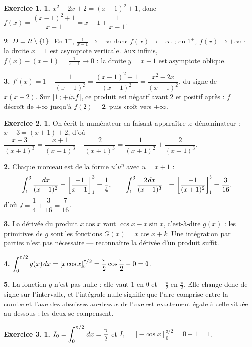 \begin{corrige}
\textbf{Exercice 1. 1.} $x^{2}-2x+2 = (x-1)^{2}+1$, donc
$f(x) = \dfrac{(x-1)^{2}+1}{x-1} = x-1+\dfrac{1}{x-1}$.

\textbf{2.} $D = R\setminus\{1\}$. En $1^{-}$, $\frac{1}{x-1}\to-\infty$
donc $f(x)\to-\infty$ ; en $1^{+}$, $f(x)\to+\infty$ : la droite $x = 1$ est
asymptote verticale. Aux infinis, $f(x)-(x-1) = \frac{1}{x-1}\to0$ : la droite
$y = x-1$ est asymptote oblique.

\textbf{3.} $f'(x) = 1-\dfrac{1}{(x-1)^{2}} = \dfrac{(x-1)^{2}-1}{(x-1)^{2}}
= \dfrac{x^{2}-2x}{(x-1)^{2}}$, du signe de $x(x-2)$. Sur
$\left]1\,;\,+inf\right[$, ce produit est négatif avant $2$ et positif
après : $f$ décroît de $+\infty$ jusqu'à $f(2) = 2$, puis croît vers
$+\infty$.

\medskip
\textbf{Exercice 2. 1.} On écrit le numérateur en faisant apparaître le
dénominateur : $x+3 = (x+1)+2$, d'où
$\dfrac{x+3}{(x+1)^{3}} = \dfrac{x+1}{(x+1)^{3}}+\dfrac{2}{(x+1)^{3}}
= \dfrac{1}{(x+1)^{2}}+\dfrac{2}{(x+1)^{3}}$.

\textbf{2.} Chaque morceau est de la forme $u'u^{n}$ avec $u = x+1$ :
\[\begin{aligned}
\int_{1}^{3}\frac{\,dx}{(x+1)^{2}} &= \left[\frac{-1}{x+1}\right]_{1}^{3}
  = \frac14, \qquad
  \int_{1}^{3}\frac{2\,dx}{(x+1)^{3}} &= \left[\frac{-1}{(x+1)^{2}}\right]_{1}^{3}
  = \frac{3}{16},
\end{aligned}\]
d'où $J = \dfrac14+\dfrac{3}{16} = \dfrac{7}{16}$.

\textbf{3.} La dérivée du produit $x\cos x$ vaut $\cos x-x\sin x$, c'est-à-dire
$g(x)$ : les primitives de $g$ sont les fonctions $G(x) = x\cos x+k$. Une
intégration par parties n'est pas nécessaire — reconnaître la dérivée d'un
produit suffit.

\textbf{4.} $\displaystyle\int_{0}^{\pi/2}g(x)\,dx
= \left[x\cos x\right]_{0}^{\pi/2}
= \frac{\pi}{2}\cos\frac{\pi}{2}-0 = 0$.

\textbf{5.} La fonction $g$ n'est pas nulle : elle vaut $1$ en $0$ et
$-\frac{\pi}{2}$ en $\frac{\pi}{2}$. Elle change donc de signe sur
l'intervalle, et l'intégrale nulle signifie que l'aire comprise entre la
courbe et l'axe des abscisses au-dessus de l'axe est exactement égale à celle
située au-dessous : les deux se compensent.

\medskip
\textbf{Exercice 3. 1.} $I_{0} = \displaystyle\int_{0}^{\pi/2}\,dx
= \frac{\pi}{2}$ et
$I_{1} = \left[-\cos x\right]_{0}^{\pi/2} = 0+1 = 1$.


\end{corrige}
